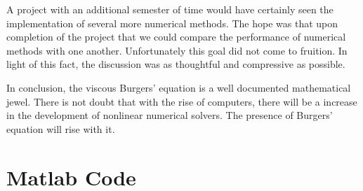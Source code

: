 \documentclass[undefended]{sfuthesis}
\begin{document}
A project with an additional semester of time would have certainly seen the implementation of several more numerical methods. The hope was that upon completion of the project that we could compare the performance of numerical methods with one another. Unfortunately this goal did not come to fruition. In light of this fact, the discussion was as thoughtful and compressive as possible.

In conclusion, the viscous Burgers' equation is a well documented mathematical jewel. There is not doubt that with the rise of computers, there will be a increase in the development of nonlinear numerical solvers. The presence of Burgers' equation will rise with it.  

\backmatter%
	
	

\appendix
\chapter{Matlab Code}
\label{sec:code}



\pagebreak






\pagebreak




\end{document}
